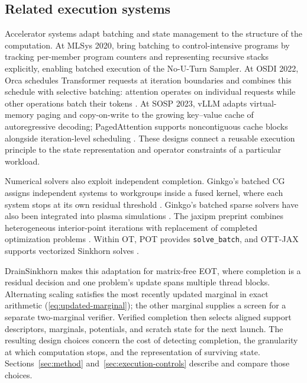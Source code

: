 \subsection{Related execution systems}

Accelerator systems adapt batching and state management to the structure of the computation. At MLSys 2020, \citet{radul2020autobatching} bring batching to control-intensive programs by tracking per-member program counters and representing recursive stacks explicitly, enabling batched execution of the No-U-Turn Sampler. At OSDI 2022, Orca schedules Transformer requests at iteration boundaries and combines this schedule with selective batching: attention operates on individual requests while other operations batch their tokens \citep{yu2022orca}. At SOSP 2023, vLLM adapts virtual-memory paging and copy-on-write to the growing key--value cache of autoregressive decoding; PagedAttention supports noncontiguous cache blocks alongside iteration-level scheduling \citep{kwon2023pagedattention}. These designs connect a reusable execution principle to the state representation and operator constraints of a particular workload.

Numerical solvers also exploit independent completion. Ginkgo's batched CG assigns independent systems to workgroups inside a fused kernel, where each system stops at its own residual threshold \citep{ginkgoBatched}. Ginkgo's batched sparse solvers have also been integrated into plasma simulations \citep{kashi2023batched}. The jaxipm preprint combines heterogeneous interior-point iterations with replacement of completed optimization problems \citep{viljoen2026jaxipm}. Within OT, POT provides \texttt{solve\_batch}, and OTT-JAX supports vectorized Sinkhorn solves \citep{flamary2021pot,pot2025batch,cuturi2022ott}.

DrainSinkhorn makes this adaptation for matrix-free EOT, where completion is a residual decision and one problem's update spans multiple thread blocks. Alternating scaling satisfies the most recently updated marginal in exact arithmetic (\cref{eq:updated-marginal}); the other marginal supplies a screen for a separate two-marginal verifier. Verified completion then selects aligned support descriptors, marginals, potentials, and scratch state for the next launch. The resulting design choices concern the cost of detecting completion, the granularity at which computation stops, and the representation of surviving state. Sections~\ref{sec:method} and~\ref{sec:execution-controls} describe and compare those choices.

